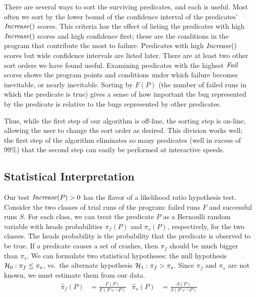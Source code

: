 There are several ways to sort the surviving predicates, and each is useful.
Most often we sort by the lower bound of the confidence interval of the predicates' $\mbox{\textit{Increase}}()$ scores.
This criteria has the effect of listing the predicates with high $\mbox{\textit{Increase}}()$ scores and high
confidence first; these are the conditions in the program that contribute the most to failure.
Predicates with high $\mbox{\textit{Increase}}()$ scores but wide confidence intervals are listed
later.  
There are at least two other sort orders we have found useful.  Examining 
predicates with the highest $\mbox{\textit{Fail}}$ scores shows the program points and conditions under which failure
becomes inevitable, or nearly inevitable.  Sorting by $F(P)$ (the number of failed runs in which the predicate
is true) gives a sense of how important the bug represented by the predicate is relative to the bugs represented
by other predicates. 

Thus, while the first step of our algorithm is off-line, the sorting step is on-line, allowing the user to change
the sort order as desired.  This division works well; the first step of the algorithm eliminates so many predicates
(well in excess of 99\%) that the second step can easily be performed at interactive speeds.

\subsection{Statistical Interpretation}

Our test $\mbox{\textit{Increase}}(P) > 0$ has the flavor of a likelihood ratio hypothesis
test.  Consider the two classes of trial runs
of the program: failed runs $F$ and successful runs $S$.  For each
class, we can treat the predicate $P$ as a Bernoulli random variable
with heads probabilities $\pi_f(P)$ and $\pi_s(P)$, respectively, for the
two classes.  The heads
probability is the probability that the predicate is observed to be
true.  If a predicate causes a set of crashes, then $\pi_f$ should be
much bigger than $\pi_s$.  We can formulate two statistical hypotheses:
the null hypothesis ${\mathcal{H}}_0:
\pi_f \leq \pi_s$, vs.\ the alternate hypothesis ${\mathcal{H}}_1: \pi_f > \pi_s$.  Since
$\pi_f$ and $\pi_s$ are not known, we must estimate them from our
data.
\begin{align*}
  \hat \pi_f(P) &= \frac{F(P)}{F(P \lor \lnot P)} &
  \hat \pi_s(P) &= \frac{S(P)}{S(P \lor \lnot P)}
\end{align*}


